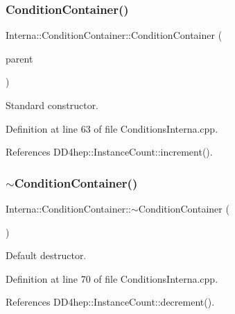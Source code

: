 \subsubsection{\texorpdfstring{Condition\+Container()}{ConditionContainer()}}
{\footnotesize\ttfamily Interna\+::\+Condition\+Container\+::\+Condition\+Container (\begin{DoxyParamCaption}\item[{\hyperlink{class_d_d4hep_1_1_geometry_1_1_det_element_object}{Geometry\+::\+Det\+Element\+Object} $\ast$}]{parent }\end{DoxyParamCaption})}



Standard constructor. 



Definition at line 63 of file Conditions\+Interna.\+cpp.



References D\+D4hep\+::\+Instance\+Count\+::increment().

\hypertarget{class_d_d4hep_1_1_conditions_1_1_interna_1_1_condition_container_a18cfd1f77eea4ae5fdf3a46ed8aa61ea}{}\label{class_d_d4hep_1_1_conditions_1_1_interna_1_1_condition_container_a18cfd1f77eea4ae5fdf3a46ed8aa61ea} 
\subsubsection{\texorpdfstring{$\sim$\+Condition\+Container()}{~ConditionContainer()}}
{\footnotesize\ttfamily Interna\+::\+Condition\+Container\+::$\sim$\+Condition\+Container (\begin{DoxyParamCaption}{ }\end{DoxyParamCaption})\hspace{0.3cm}{\ttfamily [virtual]}}



Default destructor. 



Definition at line 70 of file Conditions\+Interna.\+cpp.



References D\+D4hep\+::\+Instance\+Count\+::decrement().



